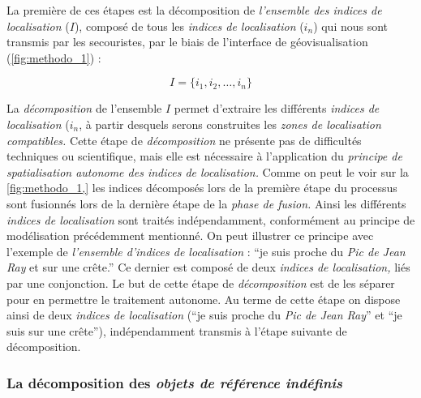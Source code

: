 La première de ces étapes est la décomposition de \emph{l'ensemble des
  indices de localisation} (\(I\)), composé de tous les \emph{indices
  de localisation} (\(i_n\)) qui nous sont transmis par les
secouristes, par le biais de l'interface de géovisualisation
(\autoref{fig:methodo_1}) :

\begin{equation}
  I = \{i_1, i_2, \dots, i_n \}
\end{equation}

La \emph{décomposition} de l'ensemble \(I\) permet d'extraire les
différents \emph{indices de localisation} (\(i_n\), à partir desquels
serons construites les \emph{zones de localisation compatibles.} Cette
étape de \emph{décomposition} ne présente pas de difficultés
techniques ou scientifique, mais elle est nécessaire à l’application
du \emph{principe de spatialisation autonome des indices de
  localisation.} Comme on peut le voir sur la \autoref{fig:methodo_1,}
les indices décomposés lors de la première étape du processus sont
fusionnés lors de la dernière étape de la \emph{phase de fusion.}
Ainsi les différents \emph{indices de localisation} sont traités
indépendamment, conformément au principe de modélisation précédemment
mentionné. On peut illustrer ce principe avec l'exemple de
\emph{l'ensemble d'indices de localisation} : \enquote{je suis proche
  du \emph{Pic de Jean Ray} et sur une crête.}  Ce dernier est composé
de deux \emph{indices de localisation,} liés par une conjonction. Le
but de cette étape de \emph{décomposition} est de les séparer pour en
permettre le traitement autonome. Au terme de cette étape on dispose
ainsi de deux \emph{indices de localisation} (\enquote{je suis proche
  du \emph{Pic de Jean Ray}} et \enquote{je suis sur une crête}),
indépendamment transmis à l'étape suivante de décomposition.

\subsubsection{La décomposition des \emph{objets de référence indéfinis}}

